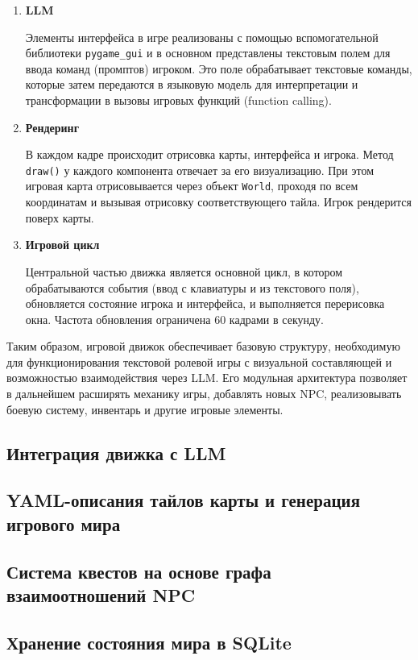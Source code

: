 \documentclass[14pt]{extarticle}
\begin{document}
\begin{enumerate}
    \item \textbf{LLM}

    Элементы интерфейса в игре реализованы с помощью вспомогательной библиотеки \texttt{pygame\_gui} и в основном представлены текстовым полем для ввода команд (промптов) игроком. Это поле обрабатывает текстовые команды, которые затем передаются в языковую модель для интерпретации и трансформации в вызовы игровых функций (function calling).

    \item \textbf{Рендеринг}

    В каждом кадре происходит отрисовка карты, интерфейса и игрока. Метод \texttt{draw()} у каждого компонента отвечает за его визуализацию. При этом игровая карта отрисовывается через объект \texttt{World}, проходя по всем координатам и вызывая отрисовку соответствующего тайла. Игрок рендерится поверх карты.

    \item \textbf{Игровой цикл}

    Центральной частью движка является основной цикл, в котором обрабатываются события (ввод с клавиатуры и из текстового поля), обновляется состояние игрока и интерфейса, и выполняется перерисовка окна. Частота обновления ограничена 60 кадрами в секунду.
\end{enumerate}

Таким образом, игровой движок обеспечивает базовую структуру, необходимую для функционирования текстовой ролевой игры с визуальной составляющей и возможностью взаимодействия через LLM. Его модульная архитектура позволяет в дальнейшем расширять механику игры, добавлять новых NPC, реализовывать боевую систему, инвентарь и другие игровые элементы.

\subsection{Интеграция движка с LLM}
\subsection{YAML-описания тайлов карты и генерация игрового мира}
\subsection{Система квестов на основе графа взаимоотношений NPC}
\subsection{Хранение состояния мира в SQLite}
\end{document}
